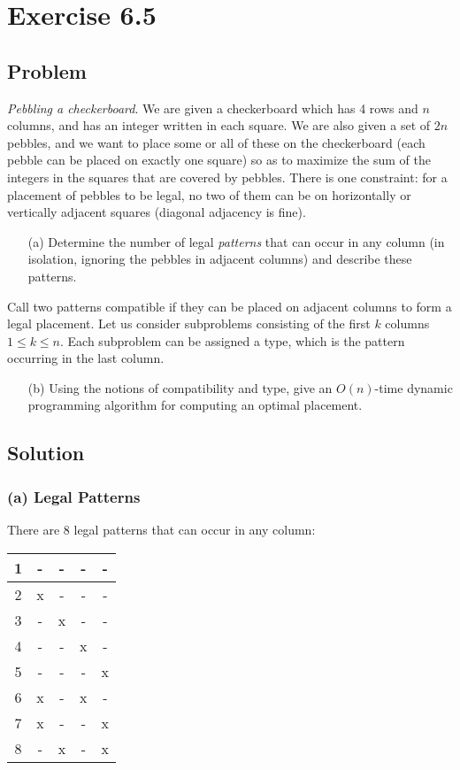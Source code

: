 \documentclass[12pt, letterpaper]{article}
\begin{document}
\section{Exercise 6.5}

\subsection{Problem}

\emph{Pebbling a checkerboard}. We are given a checkerboard which has 4 rows and \(n\) columns, and has an integer written in each square. We are also given a set of \(2n\) pebbles, and we want to place some or all of these on the checkerboard (each pebble can be placed on exactly one square) so as to maximize the sum of the integers in the squares that are covered by pebbles. There is one constraint: for a placement of pebbles to be legal, no two of them can be on horizontally or vertically adjacent squares (diagonal adjacency is fine).
\begin{itemize}
    \item[(a)] Determine the number of legal \emph{patterns} that can occur in any column (in isolation, ignoring the pebbles in adjacent columns) and describe these patterns.
\end{itemize}

Call two patterns compatible if they can be placed on adjacent columns to form a legal placement. Let us consider subproblems consisting of the first \(k\) columns \(1 \leq k \leq n\). Each subproblem can be assigned a type, which is the pattern occurring in the last column.
\begin{itemize}
    \item[(b)] Using the notions of compatibility and type, give an \(O(n)\)-time dynamic programming algorithm for computing an optimal placement.
\end{itemize}

\subsection{Solution}
\subsubsection{(a) Legal Patterns}

There are 8 legal patterns that can occur in any column:
\begin{center}
\begin{tabular}{|c||c|c|c|c|}
    \hline
    1 & - & - & - & - \\
    \hline
    2 & x & - & - & -  \\
    \hline
    3 & - & x & - & -  \\
    \hline
    4 & - & - & x & -  \\
    \hline
    5 & - & - & - & x  \\
    \hline
    6 & x & - & x & -  \\
    \hline
    7 & x & - & - & x  \\
    \hline
    8 & - & x & - & x  \\
    \hline
\end{tabular}
\end{center}
\end{document}
